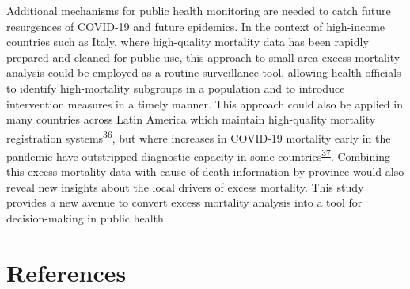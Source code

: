 \documentclass[
]{article}
\begin{document}
Additional mechanisms for public health monitoring are needed to catch future resurgences of COVID-19 and future epidemics. In the context of high-income countries such as Italy, where high-quality mortality data has been rapidly prepared and cleaned for public use, this approach to small-area excess mortality analysis could be employed as a routine surveillance tool, allowing health officials to identify high-mortality subgroups in a population and to introduce intervention measures in a timely manner. This approach could also be applied in many countries across Latin America which maintain high-quality mortality registration systems\textsuperscript{\protect\hyperlink{ref-Mikkelsen2015}{36}}⁠, but where increases in COVID-19 mortality early in the pandemic have outstripped diagnostic capacity in some countries\textsuperscript{\protect\hyperlink{ref-LeonCabrera2020}{37}}⁠. Combining this excess mortality data with cause-of-death information by province would also reveal new insights about the local drivers of excess mortality. This study provides a new avenue to convert excess mortality analysis into a tool for decision-making in public health.

\hypertarget{references}{%
\section{References}\label{references}}
\end{document}

